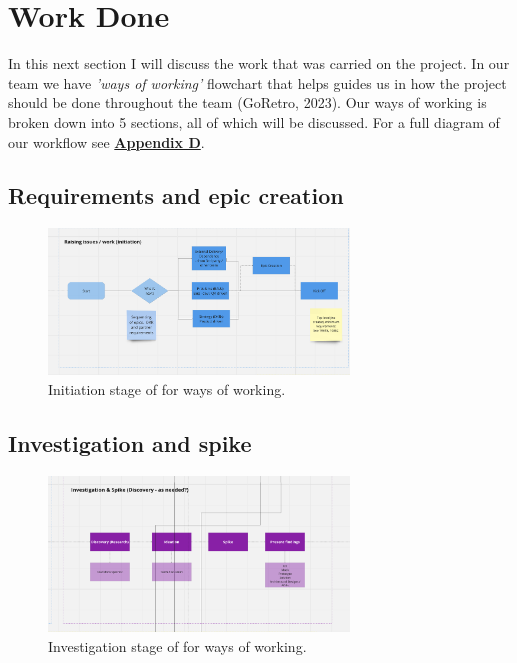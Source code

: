 \section{Work Done}
  In this next section I will discuss the work that was carried on the project. In our team we have \textit{'ways of working'}
  flowchart that helps guides us in how the project should be done throughout the team (GoRetro, 2023). Our ways of working is broken down into 5 sections, 
  all of which will be discussed. For a full diagram of our workflow see \hyperref[sec:AppendixD]{\textbf{Appendix D}}.

  \subsection{Requirements and epic creation}

  \begin{figure}[H]
    \centering
    \includegraphics[width=8cm]{assets/workflow/initiate.png}
    \caption{Initiation stage of for ways of working.}
    \label{fig:workflowInitiate}
  \end{figure}

  \subsection{Investigation and spike}

  \begin{figure}[H]
    \centering
    \includegraphics[width=8cm]{assets/workflow/investigation.png}
    \caption{Investigation stage of for ways of working.}
    \label{fig:workflowInvestigation}
  \end{figure}

